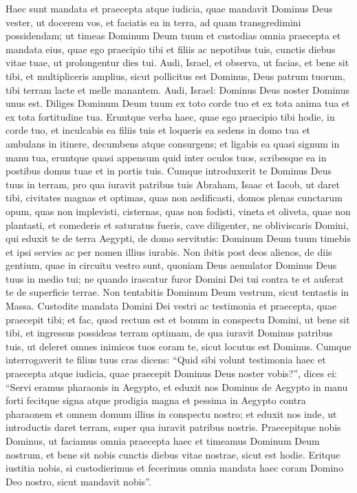 \begin{biblechapter} 
\verse Haec sunt mandata et praecepta atque iudicia, quae mandavit Dominus Deus vester, ut docerem vos, et faciatis ea in terra, ad quam transgredimini possidendam; 
\verse ut timeas Dominum Deum tuum et custodias omnia praecepta et mandata eius, quae ego praecipio tibi et filiis ac nepotibus tuis, cunctis diebus vitae tuae, ut prolongentur dies tui. 
\verse Audi, Israel, et observa, ut facias, et bene sit tibi, et multipliceris amplius, sicut pollicitus est Dominus, Deus patrum tuorum, tibi terram lacte et melle manantem. 
\verse Audi, Israel: Dominus Deus noster Dominus unus est. 
\verse Diliges Dominum Deum tuum ex toto corde tuo et ex tota anima tua et ex tota fortitudine tua. 
\verse Eruntque verba haec, quae ego praecipio tibi hodie, in corde tuo, 
\verse et inculcabis ea filiis tuis et loqueris ea sedens in domo tua et ambulans in itinere, decumbens atque consurgens; 
\verse et ligabis ea quasi signum in manu tua, eruntque quasi appensum quid inter oculos tuos, 
\verse scribesque ea in postibus domus tuae et in portis tuis. 
\verse Cumque introduxerit te Dominus Deus tuus in terram, pro qua iuravit patribus tuis Abraham, Isaac et Iacob, ut daret tibi, civitates magnas et optimas, quas non aedificasti, 
\verse domos plenas cunctarum opum, quas non implevisti, cisternas, quas non fodisti, vineta et oliveta, quae non plantasti, et comederis et saturatus fueris, 
\verse cave diligenter, ne obliviscaris Domini, qui eduxit te de terra Aegypti, de domo servitutis: 
\verse Dominum Deum tuum timebis et ipsi servies ac per nomen illius iurabis. 
\verse Non ibitis post deos alienos, de diis gentium, quae in circuitu vestro sunt, 
\verse quoniam Deus aemulator Dominus Deus tuus in medio tui; ne quando irascatur furor Domini Dei tui contra te et auferat te de superficie terrae.  
\verse Non tentabitis Dominum Deum vestrum, sicut tentastis in Massa. 
\verse Custodite mandata Domini Dei vestri ac testimonia et praecepta, quae praecepit tibi; 
\verse et fac, quod rectum est et bonum in conspectu Domini, ut bene sit tibi, et ingressus possideas terram optimam, de qua iuravit Dominus patribus tuis, 
\verse ut deleret omnes inimicos tuos coram te, sicut locutus est Dominus.  
\verse Cumque interrogaverit te filius tuus cras dicens: “Quid sibi volunt testimonia haec et praecepta atque iudicia, quae praecepit Dominus Deus noster vobis?”, 
\verse dices ei: “Servi eramus pharaonis in Aegypto, et eduxit nos Dominus de Aegypto in manu forti 
\verse fecitque signa atque prodigia magna et pessima in Aegypto contra pharaonem et omnem domum illius in conspectu nostro;  
\verse et eduxit nos inde, ut introductis daret terram, super qua iuravit patribus nostris. 
\verse Praecepitque nobis Dominus, ut faciamus omnia praecepta haec et timeamus Dominum Deum nostrum, et bene sit nobis cunctis diebus vitae nostrae, sicut est hodie. 
\verse Eritque iustitia nobis, si custodierimus et fecerimus omnia mandata haec coram Domino Deo nostro, sicut mandavit nobis”. 
\end{biblechapter}

